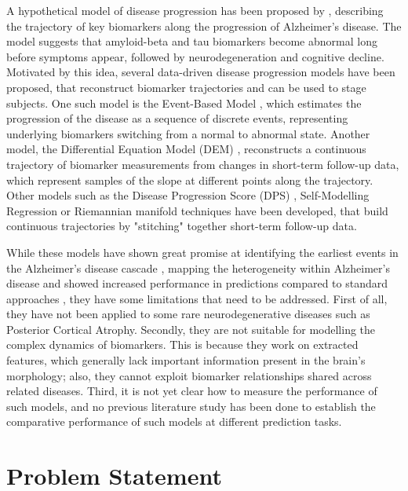 A hypothetical model of disease progression has been proposed by \cite{jack2010hypothetical}, describing the trajectory of key biomarkers along the progression of Alzheimer's disease. The model suggests that amyloid-beta and tau biomarkers become abnormal long before symptoms appear, followed by neurodegeneration and cognitive decline. Motivated by this idea, several data-driven disease progression models have been proposed, that reconstruct biomarker trajectories and can be used to stage subjects. One such model is the Event-Based Model \cite{fonteijn2012event, young2014data}, which estimates the progression of the disease as a sequence of discrete events, representing underlying biomarkers switching from a normal to abnormal state. Another model, the Differential Equation Model (DEM) \cite{villemagne2013amyloid}, reconstructs a continuous trajectory of biomarker measurements from changes in short-term follow-up data, which represent samples of the slope at different points along the trajectory. Other models such as the Disease Progression Score (DPS) \cite{jedynak2012},  Self-Modelling Regression \cite{donohue2014estimating} or Riemannian manifold techniques \cite{schiratti2015mixed} have been developed, that build continuous trajectories by "stitching" together short-term follow-up data.

While these models have shown great promise at identifying the earliest events in the Alzheimer's disease cascade \cite{young2014data, iturria2016early}, mapping the heterogeneity within Alzheimer's disease \cite{young2018uncovering} and showed increased performance in predictions compared to standard approaches \cite{oxtoby2018}, they have some limitations that need to be addressed. First of all, they have not been applied to some rare neurodegenerative diseases such as Posterior Cortical Atrophy. Secondly, they are not suitable for modelling the complex dynamics of biomarkers. This is because they work on extracted features, which generally lack important information present in the brain's morphology; also, they cannot exploit biomarker relationships shared across related diseases. Third, it is not yet clear how to measure the performance of such models, and no previous literature study has been done to establish the comparative performance of such models at different prediction tasks.

\section{Problem Statement}

